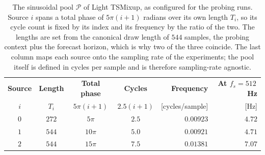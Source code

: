 \begin{table}[htbp]
\small
\centering
\begin{tabular}{@{}ccccrr@{}}
\toprule
\textbf{Source} & \textbf{Length} & \textbf{Total phase} & \textbf{Cycles} & \textbf{Frequency} & \textbf{At $f_s=512$\,Hz} \\
$i$ & $T_i$ & $5\pi(i+1)$ & $2.5(i+1)$ & [cycles/sample] & [Hz] \\
\midrule
$0$ & $272$ & $5\pi$  & $2.5$ & $0.00923$ & $4.72$ \\
$1$ & $544$ & $10\pi$ & $5.0$ & $0.00921$ & $4.71$ \\
$2$ & $544$ & $15\pi$ & $7.5$ & $0.01381$ & $7.07$ \\
\bottomrule
\end{tabular}
\caption{The sinusoidal pool $\mathcal{P}$ of Light TSMixup, as configured for the probing runs. Source $i$ spans a total phase of $5\pi(i+1)$ radians over its own length $T_i$, so its cycle count is fixed by its index and its frequency by the ratio of the two. The lengths are set from the canonical draw length of $544$ samples, the probing context plus the forecast horizon, which is why two of the three coincide. The last column maps each source onto the sampling rate of the experiments; the pool itself is defined in cycles per sample and is therefore sampling-rate agnostic.}
\label{tab:tsmixupPool}
\end{table}
